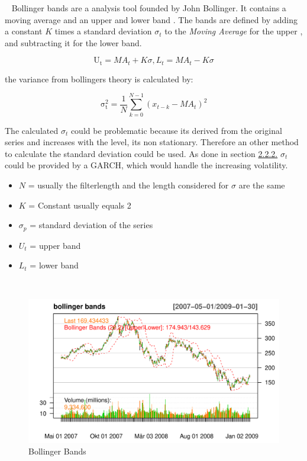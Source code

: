 \documentclass[
]{article}
\providecommand{\tightlist}{%
  \setlength{\itemsep}{0pt}\setlength{\parskip}{0pt}}
\begin{document}
~ Bollinger bands are a analysis tool founded by John Bollinger. It
contains a moving average and an upper and lower band . The bands are
defined by adding a constant \({K}\) times a standard deviation
\({\sigma_t}\) to the \emph{Moving Average} for the upper , and
subtracting it for the lower band.

\begin{equation}
  \label{eq:lower and upper bollingerbands}
  \mathrm{U_t}=MA_{t}+K\sigma, L_{t}=MA_{t}-K\sigma
\end{equation}

the variance from bollingers theory is calculated by:

\begin{equation}
  \label{eq:variance bollingerbands}
  \mathrm{\sigma_{t}^2}=\frac{1}{N}\sum_{k=0}^{N-1}(x_{t-k} -MA_t)^2
\end{equation}

The calculated \({\sigma_t}\) could be problematic because its derived
from the original series and increases with the level, its non
stationary. Therefore an other method to calculate the standard
deviation could be used. As done in section
\protect\hyperlink{garch-section}{2.2.2.} \(\sigma_t\) could be provided
by a GARCH, which would handle the increasing volatility.

\begin{itemize}
\tightlist
\item
  \({N}\) = usually the filterlength and the length considered for
  \({\sigma}\) are the same
\item
  \({K}\) = Constant usually equals 2
\item
  \(\sigma_p\) = standard deviation of the series
\item
  \({U_t}\) = upper band
\item
  \({L_t}\) = lower band
\end{itemize}

~

\begin{figure}

{\centering \includegraphics[width=0.7\linewidth]{00_main_files/figure-latex/chap2.6 -1} 

}

\caption{Bollinger Bands}\label{fig:chap2.6 }
\end{figure}
\newpage
\end{document}
